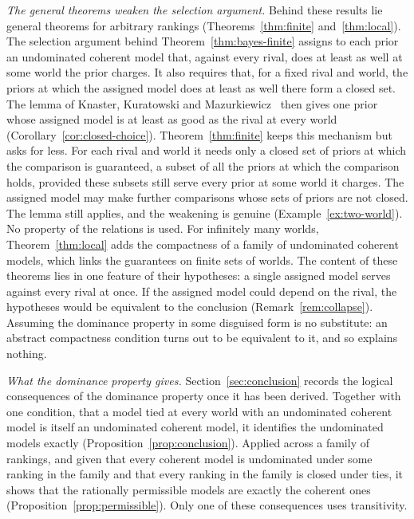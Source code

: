 \documentclass[11pt]{article}
\theoremstyle{definition}
\theoremstyle{remark}
\begin{document}
\emph{The general theorems weaken the selection argument.} Behind these results lie general theorems for arbitrary rankings (Theorems~\ref{thm:finite} and~\ref{thm:local}). The selection argument behind Theorem~\ref{thm:bayes-finite} assigns to each prior an undominated coherent model that, against every rival, does at least as well at some world the prior charges. It also requires that, for a fixed rival and world, the priors at which the assigned model does at least as well there form a closed set. The lemma of Knaster, Kuratowski and Mazurkiewicz~\cite{KKM} then gives one prior whose assigned model is at least as good as the rival at every world (Corollary~\ref{cor:closed-choice}). Theorem~\ref{thm:finite} keeps this mechanism but asks for less. For each rival and world it needs only a closed set of priors at which the comparison is guaranteed, a subset of all the priors at which the comparison holds, provided these subsets still serve every prior at some world it charges. The assigned model may make further comparisons whose sets of priors are not closed. The lemma still applies, and the weakening is genuine (Example~\ref{ex:two-world}). No property of the relations is used. For infinitely many worlds, Theorem~\ref{thm:local} adds the compactness of a family of undominated coherent models, which links the guarantees on finite sets of worlds. The content of these theorems lies in one feature of their hypotheses: a single assigned model serves against every rival at once. If the assigned model could depend on the rival, the hypotheses would be equivalent to the conclusion (Remark~\ref{rem:collapse}). Assuming the dominance property in some disguised form is no substitute: an abstract compactness condition turns out to be equivalent to it, and so explains nothing.

\emph{What the dominance property gives.} Section~\ref{sec:conclusion} records the logical consequences of the dominance property once it has been derived. Together with one condition, that a model tied at every world with an undominated coherent model is itself an undominated coherent model, it identifies the undominated models exactly (Proposition~\ref{prop:conclusion}). Applied across a family of rankings, and given that every coherent model is undominated under some ranking in the family and that every ranking in the family is closed under ties, it shows that the rationally permissible models are exactly the coherent ones (Proposition~\ref{prop:permissible}). Only one of these consequences uses transitivity.
\end{document}
